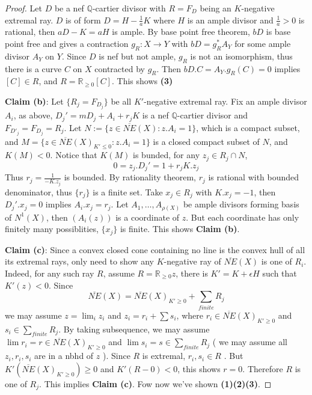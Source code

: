 \documentclass{article}
\begin{document}
\begin{proof}
Let $ D $ be a nef $ \mathbb{Q} $-cartier divisor with $ R=F_D $ being an $ K $-negative extremal ray. $ D $ is of form $ D=H-\frac{1}{a}K $ where $ H $ is an ample divisor and $ \frac{1}{a}>0 $ is rational, then $ aD-K=aH $ is ample. By base point free theorem, $ bD $ is base point free and gives a contraction $ g_R:X\to Y $ with $ bD=g_R^*A_Y $ for some ample divisor $ A_Y $ on $ Y $. Since $ D $ is nef but not ample, $ g_R $ is not an isomorphism, thus there is a curve $ C $ on $ X $ contracted by $ g_R $. Then $ bD.C=A_Y.g_R(C)=0 $ implies $ [C]\in R $, and $ R=\mathbb{R}_{\geqslant0}[C] $. This shows \textbf{(3)}


\textbf{Claim (b)}: Let $ \{R_j=F_{D_j}\} $ be all $ K' $-negative extremal ray. Fix an ample divisor $ A_i $, as above, $ D_j'=mD_j+A_i+r_jK $ is a nef $ \mathbb{Q} $-cartier divisor and $ F_{D'_j}=F_{D_j}=R_j $. Let $ N:=\{z\in \overline{NE}(X):z.A_i=1\} $, which is a compact subset, and  $ M= \{z\in \overline{NE}(X)_{K'\leqslant0}:z.A_i=1\}$ is a closed compact subset of $ N $, and $ K(M)<0 $. Notice that $ K(M) $ is bunded, for any $ z_j\in R_j\cap N $,
	$$ 0=z_j.D_j'=1+r_jK.z_j $$
 Thus $ r_j=\frac{1}{-K.z_j} $ is bounded. By rationality theorem, $ r_j $ is rational with bounded denominator, thus $ \{r_j\} $ is a finite set. Take $ x_j\in R_j $ with $ K.x_j=-1 $, then $ D_j'.x_j =0$ implies $ A_i.x_j=r_j $.  Let $ A_1,\ldots, A_{\rho(X)} $ be ample divisors forming basis of $ N^1(X) $, then $ (A_i(z)) $ is a coordinate of $ z $. But each coordinate has only finitely many possiblities, $ \{x_j\} $ is finite. This shows \textbf{Claim (b)}.
 
 \textbf{Claim (c)}: Since a convex closed cone containing no line is the convex hull of all its extremal rays, only need to show any $ K $-negative ray of $ \overline{NE}(X) $ is one of $ R_i $. Indeed, for any  such ray $ R $, assume $ R=\mathbb{R}_{\geqslant0}z $, there is $ K'=K+\epsilon H $ such that $ K'(z)<0 $.
 Since 
 $$  \overline{NE}(X)=\overline{NE}(X)_{K'\geqslant0}+\sum_{finite}R_j  $$
 we may assume $ z=\lim_iz_i $ and $ z_i=r_i+\sum s_i $, where $ r_i\in \overline{NE}(X)_{K'\geqslant0} $ and $ s_i\in \sum_{finite}R_j $. By taking subsequence, we may assume $ \lim r_i=r\in \overline{NE}(X)_{K'\geqslant0} $ and $ \lim s_i=s \in \sum_{finite}R_j$ ( we may assume all $ z_i,r_i,s_i $ are in a nbhd of $ z $ ). Since $ R $ is extremal, $ r_i,s_i\in R $ . But $ K'(\overline{NE}(X)_{K'\geqslant0})\geqslant 0 $ and $ K'(R-0)<0 $, this shows $ r=0 $. Therefore $ R $ is one of $ R_j $. This implies \textbf{Claim (c)}.
 Fow now we've shown \textbf{(1)(2)(3)}.
 

\end{proof}
\end{document}
